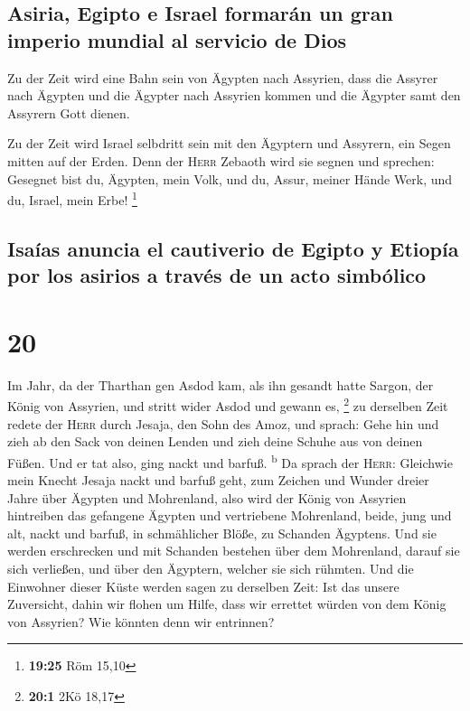 \hypertarget{asiria-egipto-e-israel-formaruxe1n-un-gran-imperio-mundial-al-servicio-de-dios}{%
\subsection{Asiria, Egipto e Israel formarán un gran imperio mundial al
servicio de
Dios}\label{asiria-egipto-e-israel-formaruxe1n-un-gran-imperio-mundial-al-servicio-de-dios}}

 Zu der Zeit wird eine Bahn sein von Ägypten nach
Assyrien, dass die Assyrer nach Ägypten und die Ägypter nach Assyrien
kommen und die Ägypter samt den Assyrern Gott dienen.

 Zu der Zeit wird Israel selbdritt sein mit den Ägyptern
und Assyrern, ein Segen mitten auf der Erden.  Denn der
\textsc{Herr} Zebaoth wird sie segnen und sprechen: Gesegnet bist du,
Ägypten, mein Volk, und du, Assur, meiner Hände Werk, und du, Israel,
mein Erbe! \footnote{\textbf{19:25} Röm 15,10}

\hypertarget{isauxedas-anuncia-el-cautiverio-de-egipto-y-etiopuxeda-por-los-asirios-a-travuxe9s-de-un-acto-simbuxf3lico}{%
\subsection{Isaías anuncia el cautiverio de Egipto y Etiopía por los
asirios a través de un acto
simbólico}\label{isauxedas-anuncia-el-cautiverio-de-egipto-y-etiopuxeda-por-los-asirios-a-travuxe9s-de-un-acto-simbuxf3lico}}

\hypertarget{section-19}{%
\section{20}\label{section-19}}

 Im Jahr, da der Tharthan gen Asdod kam, als ihn gesandt
hatte Sargon, der König von Assyrien, und stritt wider Asdod und gewann
es, \footnote{\textbf{20:1} 2Kö 18,17}  zu derselben Zeit
redete der \textsc{Herr} durch Jesaja, den Sohn des Amoz, und sprach:
Gehe hin und zieh ab den Sack von deinen Lenden und zieh deine Schuhe
aus von deinen Füßen. Und er tat also, ging nackt und barfuß.
\textsuperscript{b}  Da sprach der \textsc{Herr}:
Gleichwie mein Knecht Jesaja nackt und barfuß geht, zum Zeichen und
Wunder dreier Jahre über Ägypten und Mohrenland,  also
wird der König von Assyrien hintreiben das gefangene Ägypten und
vertriebene Mohrenland, beide, jung und alt, nackt und barfuß, in
schmählicher Blöße, zu Schanden Ägyptens.  Und sie werden
erschrecken und mit Schanden bestehen über dem Mohrenland, darauf sie
sich verließen, und über den Ägyptern, welcher sie sich rühmten.
 Und die Einwohner dieser Küste werden sagen zu derselben
Zeit: Ist das unsere Zuversicht, dahin wir flohen um Hilfe, dass wir
errettet würden von dem König von Assyrien? Wie könnten denn wir
entrinnen?

